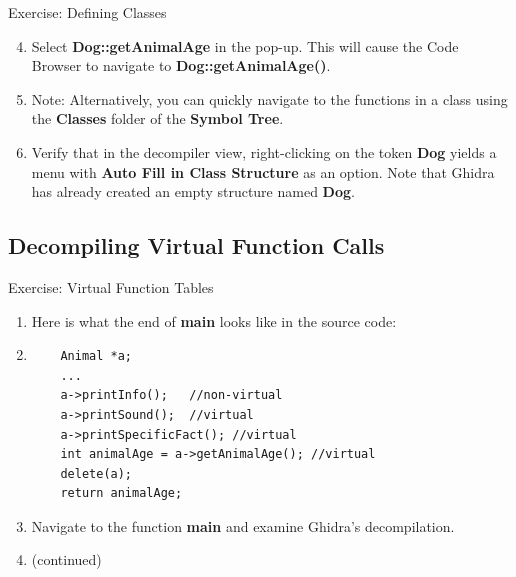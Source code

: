 \documentclass{beamer}
\begin{document}
\begin{frame}
\begin{block}{Exercise: Defining Classes}
\begin{enumerate}
\setcounter{enumi}{3}
\item Select \textbf{Dog::getAnimalAge} in the pop-up. This will cause the Code Browser to navigate to \textbf{Dog::getAnimalAge()}.
\item[] Note: Alternatively, you can quickly navigate to the functions in a class using the \textbf{Classes} folder of the \textbf{Symbol Tree}.
\item Verify that in the decompiler view, right-clicking on the token \textbf{Dog} yields a menu with \textbf{Auto Fill in Class Structure} as an option.
Note that Ghidra has already created an empty structure named \textbf{Dog}.
\end{enumerate}
\end{block}
\end{frame}

\subsection{Decompiling Virtual Function Calls}

\begin{frame}[fragile]
\begin{block}{Exercise: Virtual Function Tables}
\begin{enumerate}
\item  Here is what the end of \textbf{main} looks like in the source code:
\label{snippet}
\item[]
\begin{verbatim}
    Animal *a;
    ...
    a->printInfo();   //non-virtual
    a->printSound();  //virtual
    a->printSpecificFact(); //virtual
    int animalAge = a->getAnimalAge(); //virtual
    delete(a);
    return animalAge;
\end{verbatim}
\item[] Navigate to the function \textbf{main} and examine Ghidra's decompilation.
\item[] (continued)
\end{enumerate}
\end{block}
\end{frame}
\end{document}
